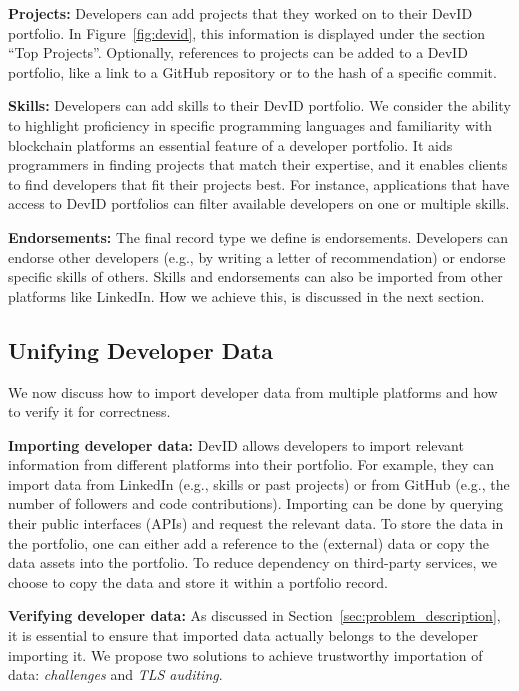 \textbf{Projects:}
Developers can add projects that they worked on to their DevID portfolio.
In Figure~\ref{fig:devid}, this information is displayed under the section \enquote{Top Projects}.
Optionally, references to projects can be added to a DevID portfolio, like a link to a GitHub repository or to the hash of a specific commit.

\textbf{Skills:}
Developers can add skills to their DevID portfolio.
We consider the ability to highlight proficiency in specific programming languages and familiarity with blockchain platforms an essential feature of a developer portfolio.
It aids programmers in finding projects that match their expertise, and it enables clients to find developers that fit their projects best.
For instance, applications that have access to DevID portfolios can filter available developers on one or multiple skills.

\textbf{Endorsements:}
The final record type we define is endorsements.
Developers can endorse other developers (e.g., by writing a letter of recommendation) or endorse specific skills of others.
Skills and endorsements can also be imported from other platforms like LinkedIn.
How we achieve this, is discussed in the next section.

\subsection{Unifying Developer Data}
\label{subsec:unifying_data}
We now discuss how to import developer data from multiple platforms and how to verify it for correctness.

\textbf{Importing developer data:}
DevID allows developers to import relevant information from different platforms into their portfolio.
For example, they can import data from LinkedIn (e.g., skills or past projects) or from GitHub (e.g., the number of followers and code contributions).
Importing can be done by querying their public interfaces (APIs) and request the relevant data.
To store the data in the portfolio, one can either add a reference to the (external) data or copy the data assets into the portfolio.
To reduce dependency on third-party services, we choose to copy the data and store it within a portfolio record.

\textbf{Verifying developer data:}
As discussed in Section~\ref{sec:problem_description}, it is essential to ensure that imported data actually belongs to the developer importing it.
We propose two solutions to achieve trustworthy importation of data: \textit{challenges} and \textit{TLS auditing}.

